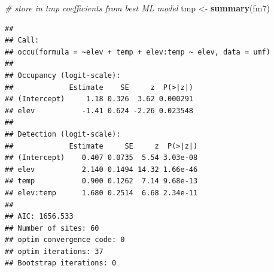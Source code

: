 \documentclass[
]{book}
\newenvironment{Shaded}{\begin{snugshade}}{\end{snugshade}}
\newcommand{\CommentTok}[1]{\textcolor[rgb]{0.56,0.35,0.01}{\textit{#1}}}
\newcommand{\KeywordTok}[1]{\textcolor[rgb]{0.13,0.29,0.53}{\textbf{#1}}}
\newcommand{\NormalTok}[1]{#1}
\newcommand{\StringTok}[1]{\textcolor[rgb]{0.31,0.60,0.02}{#1}}
\begin{document}
\begin{Shaded}
\begin{Highlighting}[]
\CommentTok{# store in tmp coefficients from best ML model}
\NormalTok{tmp <-}\StringTok{ }\KeywordTok{summary}\NormalTok{(fm7)}
\end{Highlighting}
\end{Shaded}

\begin{verbatim}
##
## Call:
## occu(formula = ~elev + temp + elev:temp ~ elev, data = umf)
##
## Occupancy (logit-scale):
##             Estimate    SE     z  P(>|z|)
## (Intercept)     1.18 0.326  3.62 0.000291
## elev           -1.41 0.624 -2.26 0.023548
##
## Detection (logit-scale):
##             Estimate     SE     z  P(>|z|)
## (Intercept)    0.407 0.0735  5.54 3.03e-08
## elev           2.140 0.1494 14.32 1.66e-46
## temp           0.900 0.1262  7.14 9.68e-13
## elev:temp      1.680 0.2514  6.68 2.34e-11
##
## AIC: 1656.533
## Number of sites: 60
## optim convergence code: 0
## optim iterations: 37
## Bootstrap iterations: 0
\end{verbatim}
\end{document}
